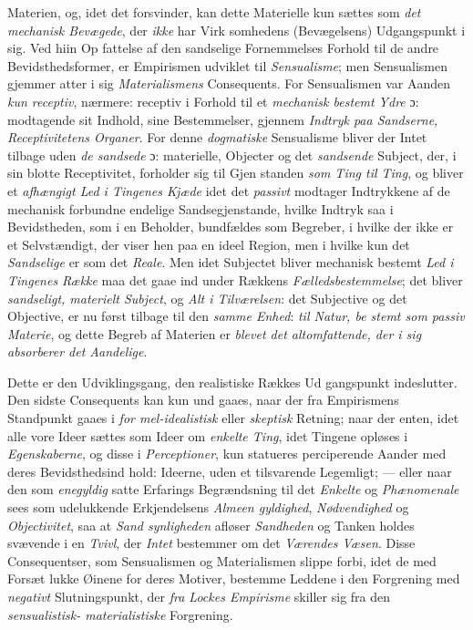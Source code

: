 Materien, og, idet det forsvinder, kan dette Materielle kun
sættes som \emph{det mechanisk Bevægede}, der \emph{ikke} har Virk\-%
somhedens (Bevægelsens) Udgangspunkt i sig. Ved hiin Op\-%
fattelse af den sandselige Fornemmelses Forhold til de andre
Bevidsthedsformer, er Empirismen udviklet til \emph{Sensualisme};
men Sensualismen gjemmer atter i sig \emph{Materialismens}
Consequents. For Sensualismen var Aanden \emph{kun receptiv},
nærmere: receptiv i Forhold til et \emph{mechanisk bestemt
Ydre} ɔ: modtagende sit Indhold, sine Bestemmelser, gjennem
\emph{Indtryk paa Sandserne, Receptivitetens Organer}.
For denne \emph{dogmatiske} Sensualisme bliver der Intet tilbage
uden \emph{de sandsede} ɔ: materielle, Objecter og det \emph{sandsende}
Subject, der, i sin blotte Receptivitet, forholder sig til Gjen\-%
standen \emph{som Ting til Ting}, og bliver et \emph{afhængigt Led
i Tingenes Kjæde} idet det \emph{passivt} modtager Indtrykkene
af de mechanisk forbundne endelige Sandsegjenstande, hvilke
Indtryk saa i Bevidstheden, som i en Beholder, bundfældes som
Begreber, i hvilke der ikke er et Selvstændigt, der viser hen
paa en ideel Region, men i hvilke kun det \emph{Sandselige} er
 \setcounter{footnote}{0}
som det \emph{Reale}. Men idet Subjectet bliver mechanisk bestemt
\emph{Led i Tingenes Række} maa det gaae ind under Rækkens
\emph{Fælledsbestemmelse}; det bliver \emph{sandseligt, materielt
Subject}, og \emph{Alt i Tilværelsen}: det Subjective og det Objective,
er nu først tilbage til den \emph{samme Enhed}: \emph{til Natur, be\-%
stemt som passiv Materie}, og dette Begreb af Materien er
\emph{blevet det altomfattende, der i sig absorberer det
Aandelige}.

Dette er den Udviklingsgang, den realistiske Rækkes Ud\-%
gangspunkt indeslutter. Den sidste Consequents kan kun und\-%
gaaes, naar der fra Empirismens Standpunkt gaaes i \emph{for\-%
mel-idealistisk} eller \emph{skeptisk} Retning; naar der enten,
idet alle vore Ideer sættes som Ideer om \emph{enkelte Ting}, idet
Tingene opløses i \emph{Egenskaberne}, og disse i \emph{Perceptioner},
kun statueres perciperende Aander med deres Bevidsthedsind\-%
hold: Ideerne, uden et tilsvarende Legemligt; --- eller naar den
som \emph{enegyldig} satte Erfarings Begrændsning til det \emph{Enkelte} og
\emph{Phænomenale} sees som udelukkende Erkjendelsens \emph{Almeen\-%
gyldighed}, \emph{Nødvendighed} og \emph{Objectivitet}, saa at \emph{Sand\-%
synligheden} afløser \emph{Sandheden} og Tanken holdes svævende i
en \emph{Tvivl}, der \emph{Intet} bestemmer om det \emph{Værendes Væsen}. Disse
Consequentser, som Sensualismen og Materialismen slippe forbi,
idet de med Forsæt lukke Øinene for deres Motiver, bestemme
Leddene i den Forgrening med \emph{negativt} Slutningspunkt, der
\emph{fra Lockes Empirisme} skiller sig fra den \emph{sensualistisk-%
materialistiske} Forgrening.

